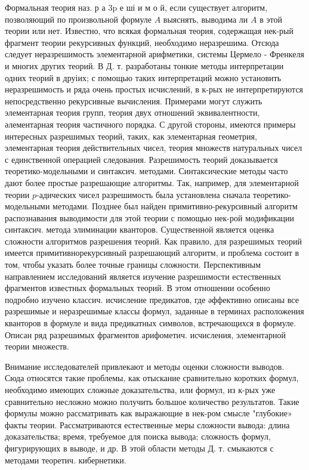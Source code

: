 \documentclass[10pt]{article}
\begin{document}
Формальная теория наз. р а $3 \mathrm{p}$ е ші и м о й, если существует алгоритм, позволяющий по произвольной формуле $A$ выяснять, выводима ли $A$ в этой теории или нет. Известно, что всякая формальная теория, содержащая нек-рый фрагмент теории рекурсивных функций, необходимо неразрешима. Отсюда следует неразрешимость элементарной арифметики, системы Цермело - Френкеля и многих других теорий. В Д. т. разработаны тонкие методы интерпретации одних теорий в друіих; с помощью таких интерпретаций можно установить неразрешимость и ряда очень простых исчислений, в к-рых не интерпретируются непосредственно рекурсивные вычисления. Примерами могут служить элементарная теория групп, теория двух отношений эквивалентности, әлементарная теория частичного порядка. С другой стороны, имеются примеры интересных разрешимых теорий, таких, как элементарная геометрия, элементарная теория действительных чисел, теория множеств натуральных чисел с единственной операцией следования. Разрешимость теорий доказывается теоретико-модельными и синтаксич. методами. Синтаксические методы часто дают более простые разрешающие алгоритмы. Так, например, для элементарной теории $p$-адических чисел разрешимость была установлена сначала теоретико-модельными методами. Позднее был найден примитивно-рекурсивный алгоритм распознавания выводимости для этой теории с помощью нек-рой модификации синтаксич. метода элиминации кванторов. Существенной является оценка сложности алгоритмов разрешения теорий. Как правило, для разрешимых теорий имеется примитивнорекурсивный разрешающий алгоритм, и проблема состоит в том, чтобы указать более точные границы сложности. Перспективным направлением исследований является изучение разрешимости естественных фрагментов известных формальных теорий. В этом отношении особенно подробно изучено классич. исчисление предикатов, где әффективно описаны все разрешимые и неразрешимые классы формул, заданные в терминах расположения кванторов в формуле и вида предикатных символов, встречающихся в формуле. Описан ряд разрешимых фрагментов арифометич. исчисления, элементарной теории множеств.



Внимание исследователей привлекают и методы оценки сложности выводов. Сюда относятся такие проблемы, как отыскание сравнительно коротких формул, необходимо имеющих сложные доказательства, или формул, из к-рых уже сравнительно несложно можно получить большое количество результатов. Такие формулы можно рассматривать как выражающие в нек-ром смысле "глубокие» факты теории. Рассматриваются естественные меры сложности вывода: длина доказательства; время, требуемое для поиска вывода; сложность формул, фигурирующих в выводе, и др. В этой области методы Д. т. смыкаются с методами теоретич. кибернетики.
\end{document}
